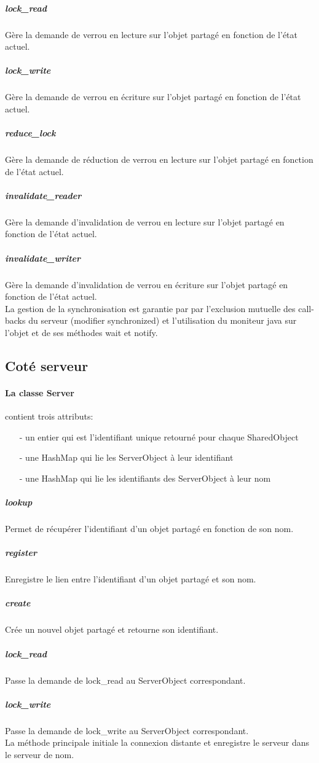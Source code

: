 \documentclass[a4paper,12pt]{article}
\begin{document}
\subparagraph{lock\_read}
Gère la demande de verrou en lecture sur l'objet partagé en fonction de l'état actuel.
\subparagraph{lock\_write}
Gère la demande de verrou en écriture sur l'objet partagé en fonction de l'état actuel.
\subparagraph{reduce\_lock}
Gère la demande de réduction de verrou en lecture sur l'objet partagé en fonction de l'état actuel.
\subparagraph{invalidate\_reader}
Gère la demande d'invalidation de verrou en lecture sur l'objet partagé en fonction de l'état actuel.
\subparagraph{invalidate\_writer}
Gère la demande d'invalidation de verrou en écriture sur l'objet partagé en fonction de l'état actuel.\\

La gestion de la synchronisation est garantie par par l'exclusion mutuelle des call-backs du serveur (modifier synchronized) et l'utilisation du moniteur java sur l'objet et de ses méthodes wait et notify.


\bigskip
\bigskip

\subsection{Coté serveur}

\bigskip

\paragraph{La classe Server}

contient trois attributs:
\begin{itemize}
\item[- un entier qui est l'identifiant unique retourné pour chaque SharedObject]
\item[- une HashMap qui lie les ServerObject à leur identifiant]
\item[- une HashMap qui lie les identifiants des ServerObject à leur nom]
\end{itemize}

\smallskip
\subparagraph{lookup}
Permet de récupérer l'identifiant d'un objet partagé en fonction de son nom.
\subparagraph{register}
Enregistre le lien entre l'identifiant d'un objet partagé et son nom.
\subparagraph{create}
Crée un nouvel objet partagé et retourne son identifiant.
\subparagraph{lock\_read}
Passe la demande de lock\_read au ServerObject correspondant.
\subparagraph{lock\_write}
Passe la demande de lock\_write au ServerObject correspondant.\\

La méthode principale initiale la connexion distante et enregistre le serveur dans le serveur de nom.
\end{document}
